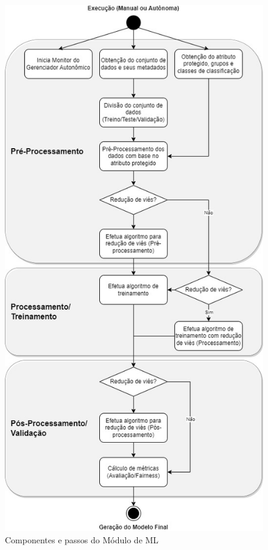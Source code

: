 \documentclass[Portugues,Final]{ic-tese-v3}
\begin{document}
\begin{figure}[H]
\centering
\includegraphics[scale=0.45]{images/ml-fairness-pipeline.jpg}
\caption {Componentes e passos do Módulo de ML}
\label{fig:FairnessPipeline}
\end{figure}
\end{document}
